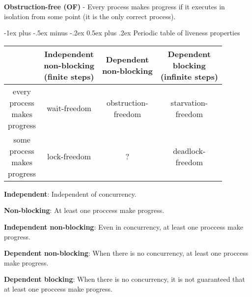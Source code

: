 \documentclass[10pt,landscape]{article}
\makeatletter
\renewcommand{\subsection}{\@startsection{subsection}{2}{0mm}%
                                {-1ex plus -.5ex minus -.2ex}%
                                {0.5ex plus .2ex}%
                                {\normalfont\normalsize\bfseries}}
\makeatother
\begin{document}
\begin{multicols}{3}
    \textbf{Obstruction-free (OF)} - Every process makes progress if it executes in isolation from some point (it is the only correct process).

    \subsection{Periodic table of liveness properties}

    \begin{center}
        \footnotesize
        \begin{tabular}{ |c|c|c|c| }
            \hline
             & \thead{Independent \\ non-blocking \\ (finite steps)}  &  \thead{Dependent \\ non-blocking}  &  \thead{Dependent \\ blocking \\(infinite steps)} \\
            \hline
            \thead{every          \\process  \\makes \\progress} & wait-freedom                         & \thead{obstruction- \\freedom}      & \thead{starvation- \\freedom} \\
            \thead{some           \\process   \\makes \\progress} & lock-freedom                         & ?                                   & \thead{deadlock- \\freedom}\\
            \hline
        \end{tabular}
    \end{center}
    \textbf{Independent}: Independent of concurrency.

    \textbf{Non-blocking}: At least one proccess make progress.

    \textbf{Independent non-blocking}: Even in concurrency, at least one proccess make progress.

    \textbf{Dependent non-blocking}: When there is no concurrency, at least one proccess make progress.

    \textbf{Dependent blocking}: When there is no concurrency, it is not guaranteed that at least one proccess make progress.




\end{multicols}
\end{document}
